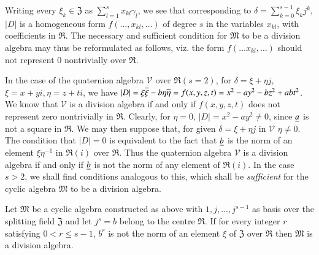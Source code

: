 Writing every $\xi_k \in \mathfrak{Z}$ as $\sum\limits^s_{l=1} x_{kl}
\gamma_l$, we see that corresponding to $\delta =
\sum\limits^{s-1}_{k=0} \xi_k j^k$, $|D|$ is a homogeneous form
$f(\ldots, x_{kl}, \ldots)$ of degree $s$ in the variables $x_{kl}$,
with coefficients in $\mathfrak{R}$. The necessary and sufficient
condition for $\mathfrak{M}$ to be a division algebra may thus be
reformulated as follows, viz. the form $f(\ldots x_{kl},\ldots)$
should \pageoriginale not represent $0$ nontrivially over
$\mathfrak{R}$. 

In the case of the quaternion algebra $\mathscr{V}$ over
$\mathfrak{R}(s=2)$, for $\delta = \xi + \eta j$, $\xi = x + y i, \eta
= z + t i$, we have $|D| = \xi \overline{\xi} - b \eta \overline{\eta} =
f(x,y,z,t) = x^2 - ay^2 - bz^2 + abt^2$. We know that $\mathscr{V}$ is
a division algebra if and only if $f(x,y,z,t)$ does not represent zero
nontrivially in $\mathfrak{R}$. Clearly, for $\eta=0$,
$|D|=x^2-ay^2\neq 0$, since $\underline{a}$ is not a square in
$\mathfrak{R}$. We may then suppose that, for given $\delta = \xi +
\eta j $ in $\mathscr{V}$ $\eta \neq 0$. The condition that $|D|=0$ is
equivalent to the fact that $\underline{b}$ is the norm of an element $\xi
\eta^{-1}$ in $\mathfrak{R}(i)$ over $\mathfrak{R}$. Thus the
quaternion algebra $\mathscr{V}$ is a division algebra if and only if
$\underline{b}$ is not the norm of any element of $\mathfrak{R}(i)$. In the
case $s>2$, we shall find conditions analogous to this, which shall be
{\em sufficient} for the cyclic algebra $\mathfrak{M}$ to be a
division algebra.

\begin{thm}\label{chap1:thm4}
Let $\mathfrak{M}$ be a cyclic algebra constructed as above with
$1,j,\ldots, j^{s-1}$ as basis over the splitting field $\mathfrak{Z}$
and let $j^s=b$ belong to the centre $\mathfrak{R}$. If for every
integer $r$ satisfying $0< r \leq s-1$, $b^r$ is not the norm of an
element $\xi$ of $\mathfrak{Z}$ over $\mathfrak{R}$ then
$\mathfrak{M}$ is a division algebra. 
\end{thm}

